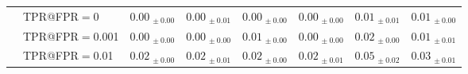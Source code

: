 \begin{table}[t]
\begin{tabular}{llcccccc}
     & TPR@FPR$=$0 & $0.00_{\,\pm0.00}$ & $0.00_{\,\pm0.01}$ & $0.00_{\,\pm0.00}$ & $0.00_{\,\pm0.00}$ & $0.01_{\,\pm0.01}$ & $0.01_{\,\pm0.00}$ \\
     & TPR@FPR$=$0.001 & $0.00_{\,\pm0.00}$ & $0.00_{\,\pm0.00}$ & $0.01_{\,\pm0.00}$ & $0.00_{\,\pm0.00}$ & $0.02_{\,\pm0.00}$ & $0.01_{\,\pm0.01}$ \\
     & TPR@FPR$=$0.01 & $0.02_{\,\pm0.00}$ & $0.02_{\,\pm0.01}$ & $0.02_{\,\pm0.00}$ & $0.02_{\,\pm0.01}$ & $0.05_{\,\pm0.02}$ & $0.03_{\,\pm0.01}$ \\
    \bottomrule
  \end{tabular}
\end{table}
